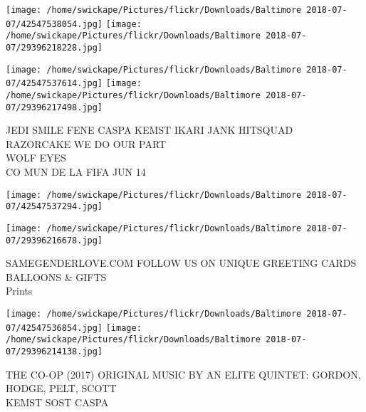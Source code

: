 \documentclass[10pt,letterpaper]{article}
\begin{document}
\texttt{[image: /home/swickape/Pictures/flickr/Downloads/Baltimore 2018-07-07/42547538054.jpg]}
\texttt{[image: /home/swickape/Pictures/flickr/Downloads/Baltimore 2018-07-07/29396218228.jpg]}

\texttt{[image: /home/swickape/Pictures/flickr/Downloads/Baltimore 2018-07-07/42547537614.jpg]}
\texttt{[image: /home/swickape/Pictures/flickr/Downloads/Baltimore 2018-07-07/29396217498.jpg]}

JEDI SMILE FENE CASPA KEMST IKARI JANK HITSQUAD\\
RAZORCAKE WE DO OUR PART\\
WOLF EYES\\
CO MUN DE LA FIFA JUN 14
\pagebreak

\texttt{[image: /home/swickape/Pictures/flickr/Downloads/Baltimore 2018-07-07/42547537294.jpg]}

\vspace{0.25in}
\texttt{[image: /home/swickape/Pictures/flickr/Downloads/Baltimore 2018-07-07/29396216678.jpg]}

SAMEGENDERLOVE.COM FOLLOW US ON UNIQUE GREETING CARDS BALLOONS \& GIFTS\\
Prints
\pagebreak

\texttt{[image: /home/swickape/Pictures/flickr/Downloads/Baltimore 2018-07-07/42547536854.jpg]}
\texttt{[image: /home/swickape/Pictures/flickr/Downloads/Baltimore 2018-07-07/29396214138.jpg]}

THE CO{-}OP (2017) ORIGINAL MUSIC BY AN ELITE QUINTET: GORDON, HODGE, PELT, SCOTT\\
KEMST SOST CASPA
\pagebreak
\end{document}
